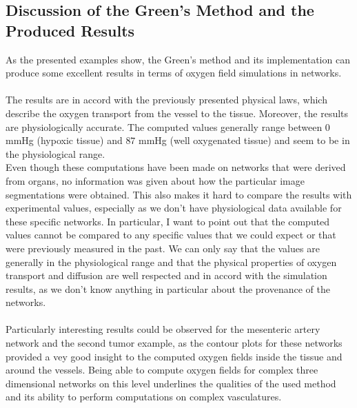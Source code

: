 \newpage
\subsection{Discussion of the Green's Method and the Produced Results}
\label{DiscGreens}

As the presented examples show, the Green's method and its implementation can produce some excellent results in terms of oxygen field simulations in networks.\\
\\The results are in accord with the previously presented physical laws, which describe the oxygen transport from the vessel to the tissue. Moreover, the results are physiologically accurate. The computed values generally range between $0$ mmHg (hypoxic tissue) and $87$ mmHg (well oxygenated tissue) and seem to be in the physiological range.
\\Even though these computations have been made on networks that were derived from organs, no information was given about how the particular image segmentations were obtained. This also makes it hard to compare the results with experimental values, especially as we don't have physiological data available for these specific networks. In particular, I want to point out that the computed values cannot be compared to any specific values that we could expect or that were previously measured in the past. We can only say that the values are generally in the physiological range and that the physical properties of oxygen transport and diffusion are well respected and in accord with the simulation results, as we don't know anything in particular about the provenance of the networks.\\
\\Particularly interesting results could be observed for the mesenteric artery network and the second tumor example, as the contour plots for these networks provided a vey good insight to the computed oxygen fields inside the tissue and around the vessels. Being able to compute oxygen fields for complex three dimensional networks on this level underlines the qualities of the used method and its ability to perform computations on complex vasculatures.\\
